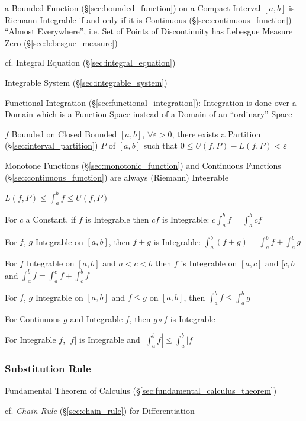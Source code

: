 
a Bounded Function (\S\ref{sec:bounded_function}) on a Compact Interval $[a,b]$
is Riemann Integrable if and only if it is Continuous
(\S\ref{sec:continuous_function}) ``Almost Everywhere'', i.e. Set of Points of
Discontinuity has Lebesgue Measure Zero (\S\ref{sec:lebesgue_measure})

cf. Integral Equation (\S\ref{sec:integral_equation})

\fist Integrable System (\S\ref{sec:integrable_system})

\fist Functional Integration (\S\ref{sec:functional_integration}): Integration
is done over a Domain which is a Function Space instead of a Domain of an
``ordinary'' Space

$f$ Bounded on Closed Bounded $[a,b]$, $\forall \varepsilon >0$, there
exists a Partition (\S\ref{sec:interval_partition}) $P$ of $[a,b]$
such that $0 \leq U(f,P) - L(f,P) < \varepsilon$ %

Monotone Functions (\S\ref{sec:monotonic_function}) and Continuous
Functions (\S\ref{sec:continuous_function}) are always (Riemann)
Integrable

$L(f,P) \leq \int_a^b f \leq U(f,P)$

For $c$ a Constant, if $f$ is Integrable then $cf$ is Integrable: $c
\int_a^b f = \int_a^b c f$

For $f$, $g$ Integrable on $[a,b]$, then $f + g$ is Integrable:
$\int_a^b (f+g) = \int_a^b f + \int_a^b g$

For $f$ Integrable on $[a,b]$ and $a < c < b$ then $f$ is Integrable
on $[a,c]$ and $[c,b$ and $\int_a^b f = \int_a^c f + \int_c^b f$

For $f$, $g$ Integrable on $[a,b]$ and $f \leq g$ on $[a,b]$, then
$\int_a^b f \leq \int_a^b g$

For Continuous $g$ and Integrable $f$, then $g \circ f$ is Integrable

For Integrable $f$, $|f|$ is Integrable and $|\int_a^b f| \leq
\int_a^b |f|$



\subsubsection{Substitution Rule}\label{sec:substitution_rule}

Fundamental Theorem of Calculus (\S\ref{sec:fundamental_calculus_theorem})

\fist cf. \emph{Chain Rule} (\S\ref{sec:chain_rule}) for Differentiation




